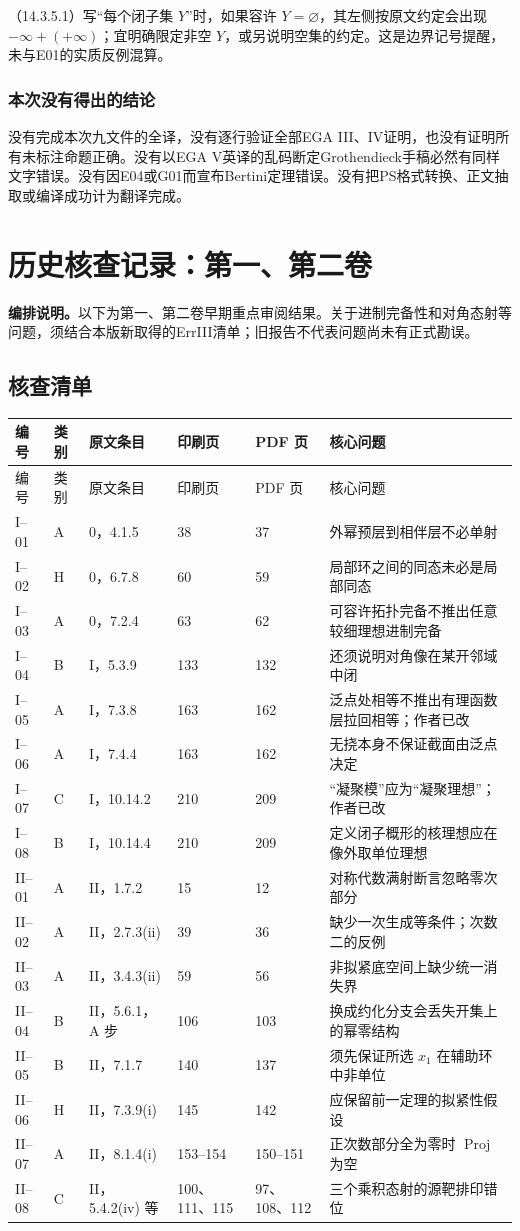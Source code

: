 \documentclass[UTF8,a4paper]{ctexbook}
\DeclareMathOperator{\Proj}{Proj}
\newcommand{\egasection}[1]{\section*{#1}\addcontentsline{toc}{section}{#1}}
\newcommand{\NewNote}[1]{\par\smallskip\noindent\textbf{编排说明。}#1\par\smallskip}
\begin{document}
（14.3.5.1）写“每个闭子集 $Y$”时，如果容许 $Y=\varnothing$，其左侧按原文约定会出现 $-\infty+(+\infty)$；宜明确限定非空 $Y$，或另说明空集的约定。这是边界记号提醒，未与E01的实质反例混算。

\egasection{本次没有得出的结论}
没有完成本次九文件的全译，没有逐行验证全部EGA III、IV证明，也没有证明所有未标注命题正确。没有以EGA V英译的乱码断定Grothendieck手稿必然有同样文字错误。没有因E04或G01而宣布Bertini定理错误。没有把PS格式转换、正文抽取或编译成功计为翻译完成。
\setcounter{secnumdepth}{-2}
\part{历史核查记录：第一、第二卷}
\setcounter{secnumdepth}{2}
\NewNote{以下为第一、第二卷早期重点审阅结果。关于进制完备性和对角态射等问题，须结合本版新取得的ErrIII清单；旧报告不代表问题尚未有正式勘误。}
\chapter{核查清单}
\small
\setlength{\tabcolsep}{2.4pt}
\begin{longtable}{@{}p{}p{}p{}p{}p{}p{}@{}}
\toprule
编号 & 类别 & 原文条目 & 印刷页 & PDF 页 & 核心问题\\\midrule
\endfirsthead
\toprule 编号 & 类别 & 原文条目 & 印刷页 & PDF 页 & 核心问题\\\midrule\endhead
I--01&A&0，4.1.5&38&37&外幂预层到相伴层不必单射\\
I--02&H&0，6.7.8&60&59&局部环之间的同态未必是局部同态\\
I--03&A&0，7.2.4&63&62&可容许拓扑完备不推出任意较细理想进制完备\\
I--04&B&I，5.3.9&133&132&还须说明对角像在某开邻域中闭\\
I--05&A&I，7.3.8&163&162&泛点处相等不推出有理函数层拉回相等；作者已改\\
I--06&A&I，7.4.4&163&162&无挠本身不保证截面由泛点决定\\
I--07&C&I，10.14.2&210&209&“凝聚模”应为“凝聚理想”；作者已改\\
I--08&B&I，10.14.4&210&209&定义闭子概形的核理想应在像外取单位理想\\\midrule
II--01&A&II，1.7.2&15&12&对称代数满射断言忽略零次部分\\
II--02&A&II，2.7.3(ii)&39&36&缺少一次生成等条件；次数二的反例\\
II--03&A&II，3.4.3(ii)&59&56&非拟紧底空间上缺少统一消失界\\
II--04&B&II，5.6.1，A 步&106&103&换成约化分支会丢失开集上的幂零结构\\
II--05&B&II，7.1.7&140&137&须先保证所选 $x_1$ 在辅助环中非单位\\
II--06&H&II，7.3.9(i)&145&142&应保留前一定理的拟紧性假设\\
II--07&A&II，8.1.4(i)&153--154&150--151&正次数部分全为零时 $\Proj$ 为空\\
II--08&C&II，5.4.2(iv) 等&100、111、115&97、108、112&三个乘积态射的源靶排印错位\\
\bottomrule
\end{longtable}
\normalsize
\end{document}
